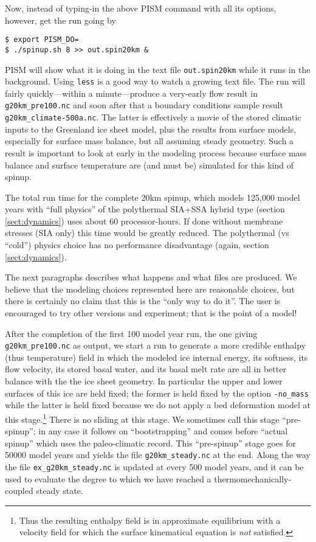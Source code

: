 Now, instead of typing-in the above PISM command with all its options, however, get the run going by
\begin{verbatim}
$ export PISM_DO=
$ ./spinup.sh 8 >> out.spin20km &
\end{verbatim}
\noindent PISM will show what it is doing in the text file \texttt{out.spin20km} while it runs in the background.  Using \texttt{less} is a good way to watch a growing text file.  The run will fairly quickly---within a minute---produce a very-early flow result in \texttt{g20km_pre100.nc} and soon after that a boundary conditions sample result \texttt{g20km_climate-500a.nc}.  The latter is effectively a movie of the stored climatic inputs to the Greenland ice sheet model, plus the results from surface models, especially for surface mass balance, but all assuming steady geometry.  Such a result is important to look at early in the modeling process because surface mass balance and surface temperature are (and must be) simulated for this kind of spinup.

The total run time for the complete 20km spinup, which models 125,000 model years with ``full physics'' of the polythermal SIA+SSA hybrid type (section \ref{sect:dynamics}) uses about 60 processor-hours.  If done without membrane stresses (SIA only) this time would be greatly reduced.  The polythermal (vs ``cold'') physics choice has no performance disadvantage (again, section \ref{sect:dynamics}).

The next paragraphs describes what happens and what files are produced.  We believe that the modeling choices represented here are reasonable choices, but there is certainly no claim that this is the ``only way to do it''.  The user is encouraged to try other versions and experiment; that is the point of a model!

After the completion of the first 100 model year run, the one giving \texttt{g20km_pre100.nc} as output, we start a run to generate a more credible enthalpy (thus temperature) field in which the modeled ice internal energy, its softness, its flow velocity, its stored basal water, and its basal melt rate are all in better balance with the the ice sheet geometry.  In particular the upper and lower surfaces of this ice are held fixed; the former is held fixed by the option \texttt{-no_mass} while the latter is held fixed because we do not apply a bed deformation model at this stage.\footnote{Thus the resulting enthalpy field is in approximate equilibrium with a velocity field for which the surface kinematical equation \cite{Fowler} is \emph{not} satisfied.}  There is no sliding at this stage.  We sometimes call this stage ``pre-spinup''; in any case it follows on ``bootstrapping'' and comes before ``actual spinup'' which uses the paleo-climatic record.  This ``pre-spinup'' stage goes for 50000 model years and yields the file \texttt{g20km_steady.nc} at the end.  Along the way the file \texttt{ex_g20km_steady.nc} is updated at every 500 model years, and it can be used to evaluate the degree to which we have reached a thermomechanically-coupled steady state.

